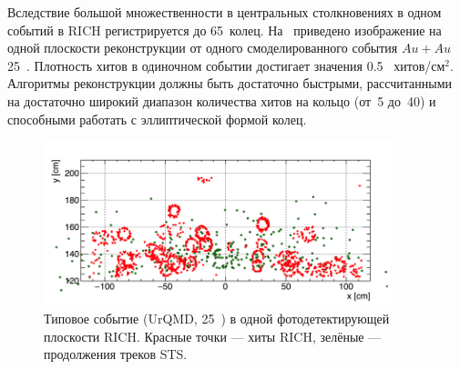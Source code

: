Вследствие большой множественности в центральных столкновениях в одном событий в RICH регистрируется до 65~колец.
На~ приведено изображение на одной плоскости реконструкции от одного смоделированного события $Au+Au$ 25~\GeVperNucl{}. Плотность хитов в одиночном событии достигает значения 0.5~ хитов/см$^{2}$. Алгоритмы реконструкции должны быть достаточно быстрыми, рассчитанными на достаточно широкий диапазон количества хитов на кольцо (от~5 до~40) и способными работать с эллиптической формой колец.

\begin{figure}[H]
\includegraphics[width=0.9\textwidth]{pictures/CbmRichOneEvent.png}
\caption{Типовое событие (UrQMD, 25~\GeVperNucl{}) в одной фотодетектирующей плоскости RICH. Красные точки --- хиты RICH, зелёные --- продолжения треков STS.}
\label{fig:CbmRichOneEvent}
\end{figure}

